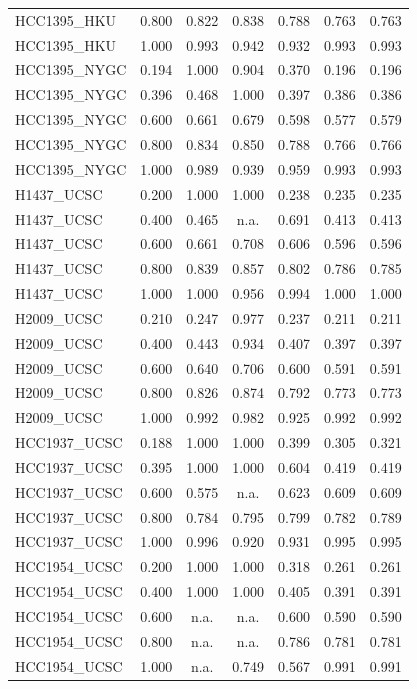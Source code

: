 \documentclass[pdflatex,sn-nature]{sn-jnl}
\begin{document}
\begin{small}
\begin{longtable}{@{}llccccc@{}}
  HCC1395\_HKU & 0.800 & 0.822 & 0.838 & 0.788 & 0.763 & 0.763 \\
  HCC1395\_HKU & 1.000 & 0.993 & 0.942 & 0.932 & 0.993 & 0.993 \\
  \addlinespace
  HCC1395\_NYGC & 0.194 & 1.000 & 0.904 & 0.370 & 0.196 & 0.196 \\
  HCC1395\_NYGC & 0.396 & 0.468 & 1.000 & 0.397 & 0.386 & 0.386 \\
  HCC1395\_NYGC & 0.600 & 0.661 & 0.679 & 0.598 & 0.577 & 0.579 \\
  HCC1395\_NYGC & 0.800 & 0.834 & 0.850 & 0.788 & 0.766 & 0.766 \\
  HCC1395\_NYGC & 1.000 & 0.989 & 0.939 & 0.959 & 0.993 & 0.993 \\
  \addlinespace
  H1437\_UCSC & 0.200 & 1.000 & 1.000 & 0.238 & 0.235 & 0.235 \\
  H1437\_UCSC & 0.400 & 0.465 & n.a. & 0.691 & 0.413 & 0.413 \\
  H1437\_UCSC & 0.600 & 0.661 & 0.708 & 0.606 & 0.596 & 0.596 \\
  H1437\_UCSC & 0.800 & 0.839 & 0.857 & 0.802 & 0.786 & 0.785 \\
  H1437\_UCSC & 1.000 & 1.000 & 0.956 & 0.994 & 1.000 & 1.000 \\
  \addlinespace
  H2009\_UCSC & 0.210 & 0.247 & 0.977 & 0.237 & 0.211 & 0.211 \\
  H2009\_UCSC & 0.400 & 0.443 & 0.934 & 0.407 & 0.397 & 0.397 \\
  H2009\_UCSC & 0.600 & 0.640 & 0.706 & 0.600 & 0.591 & 0.591 \\
  H2009\_UCSC & 0.800 & 0.826 & 0.874 & 0.792 & 0.773 & 0.773 \\
  H2009\_UCSC & 1.000 & 0.992 & 0.982 & 0.925 & 0.992 & 0.992 \\
  \addlinespace
  HCC1937\_UCSC & 0.188 & 1.000 & 1.000 & 0.399 & 0.305 & 0.321 \\
  HCC1937\_UCSC & 0.395 & 1.000 & 1.000 & 0.604 & 0.419 & 0.419 \\
  HCC1937\_UCSC & 0.600 & 0.575 & n.a. & 0.623 & 0.609 & 0.609 \\
  HCC1937\_UCSC & 0.800 & 0.784 & 0.795 & 0.799 & 0.782 & 0.789 \\
  HCC1937\_UCSC & 1.000 & 0.996 & 0.920 & 0.931 & 0.995 & 0.995 \\
  \addlinespace
  HCC1954\_UCSC & 0.200 & 1.000 & 1.000 & 0.318 & 0.261 & 0.261 \\
  HCC1954\_UCSC & 0.400 & 1.000 & 1.000 & 0.405 & 0.391 & 0.391 \\
  HCC1954\_UCSC & 0.600 & n.a. & n.a. & 0.600 & 0.590 & 0.590 \\
  HCC1954\_UCSC & 0.800 & n.a. & n.a. & 0.786 & 0.781 & 0.781 \\
  HCC1954\_UCSC & 1.000 & n.a. & 0.749 & 0.567 & 0.991 & 0.991 \\
\end{longtable}
\end{small}
\end{document}

